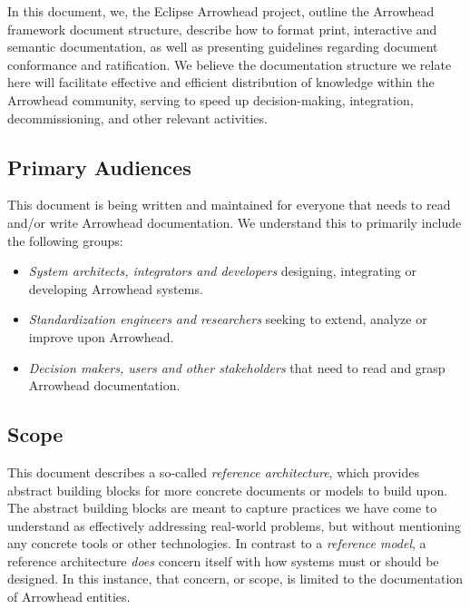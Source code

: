 %
%

In this document, we, the Eclipse Arrowhead project, outline the Arrowhead framework document structure, describe how to format print, interactive and semantic documentation, as well as presenting guidelines regarding document conformance and ratification.
We believe the documentation structure we relate here will facilitate effective and efficient distribution of knowledge within the Arrowhead community, serving to speed up decision-making, integration, decommissioning, and other relevant activities.

\subsection{Primary Audiences}
\label{sec:introduction:audiences}

This document is being written and maintained for everyone that needs to read and/or write Arrowhead documentation.
We understand this to primarily include the following groups:

\begin{itemize}
\item \textit{System architects, integrators and developers} designing, integrating or developing Arrowhead systems.
\item \textit{Standardization engineers and researchers} seeking to extend, analyze or improve upon Arrowhead.
\item \textit{Decision makers, users and other stakeholders} that need to read and grasp Arrowhead documentation.
\end{itemize}

\subsection{Scope}
\label{sec:introduction:scope}

This document describes a so-called \textit{reference architecture}, which provides abstract building blocks for more concrete documents or models to build upon.
The abstract building blocks are meant to capture practices we have come to understand as effectively addressing real-world problems, but without mentioning any concrete tools or other technologies.
In contrast to a \textit{reference model}, a reference architecture \textit{does} concern itself with how systems must or should be designed.
In this instance, that concern, or scope, is limited to the documentation of Arrowhead entities.

